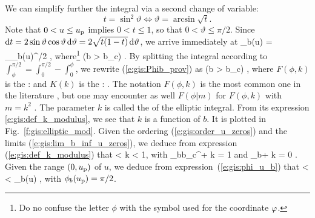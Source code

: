 We can simplify further the integral via a second change of variable:
\[
    t = \sin^2 \vartheta \iff \vartheta = \arcsin\sqrt{t} .
\]
Note that $0<u\leq u_{\rm p}$ implies $0 < t \leq 1$, so that $0<\vartheta\leq \pi/2$.
Since $\mathrm{d} t = 2\sin\vartheta\cos\vartheta \, \mathrm{d}\vartheta = 2\sqrt{t(1-t)}\, \mathrm{d}\vartheta$,
we arrive immediately at
\be \label{e:gis:Phib_prov}
    \Phi_b(u) =   \int_{\phi_b(u)}^{\pi/2}
      ,
\ee
where\footnote{Do no confuse the letter $\phi$ with the symbol used
for the coordinate $\varphi$.}
\be \label{e:gis:phi_u_b}
     \qquad (b > b_{\rm c}) .
\ee
By splitting the integral according to $\int_\phi^{\pi/2} = \int_0^{\pi/2} - \int_0^\phi$,
we rewrite (\ref{e:gis:Phib_prov}) as
\be \label{e:gis:Phib_elliptic_int}
     \qquad (b > b_{\rm c}) ,
\ee
where $F(\phi, k)$ is the
 \cite{ByrdF71,GradsRGTJ115,AbramS72}:
\be \label{e:gis:def_incompl_elliptic_int}
\ee
and $K(k)$ is the :
\be \label{e:gis:def_K_complete}
    .
\ee
The notation $F(\phi, k)$ is the most common one
in the literature \cite{ByrdF71,GradsRGTJ115}, but one may encounter as well
$F(\phi|m)$ for $F(\phi, k)$ with $m=k^2$ \cite{AbramS72}.
The parameter $k$ is called the  of
the elliptic integral. From its expression \eqref{e:gis:def_k_modulus}, we
see that $k$ is a function of $b$. It is plotted in Fig.~\ref{f:gis:elliptic_mod}.
Given the ordering (\ref{e:gis:order_u_zeros}) and the limits (\ref{e:gis:lim_b_inf_u_zeros}),
we deduce from expression (\ref{e:gis:def_k_modulus}) that
 < k < 1,
\ee
with
\be \label{e:gis:k_limits_b_gt_bc}
    \lim_{b\to b_{\rm c}^+} k = 1 \qquad\mbox{and}\qquad
    \lim_{b\to +\infty} k = 0 .
\ee
Given the range $(0, u_{\rm p})$ of $u$, we deduce from expression~(\ref{e:gis:phi_u_b})
that
 <  \arcsin {}
     < \phi_b(u) \leq {} ,
\ee
with $\phi_b(u_{\rm p}) = \pi/2$.

